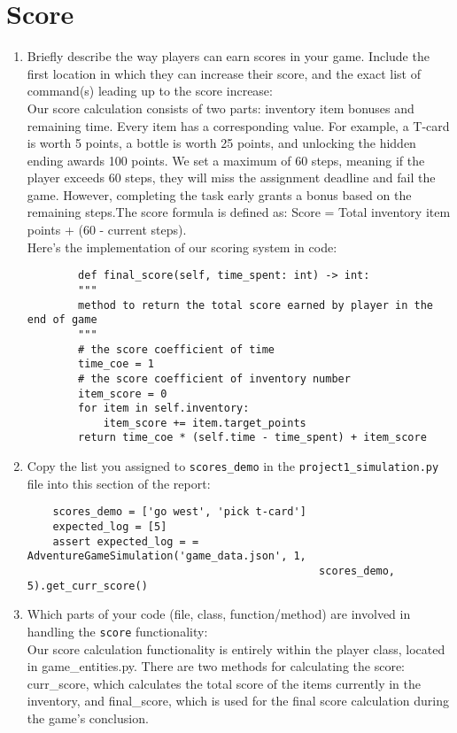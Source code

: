 \documentclass[11pt]{article}
\begin{document}
\section*{Score}
\begin{enumerate}

    \item Briefly describe the way players can earn scores in your game. Include the first location in which they can increase their score, and the exact list of command(s) leading up to the score increase:\\
    Our score calculation consists of two parts: inventory item bonuses and remaining time. Every item has a corresponding value. For example, a T-card is worth 5 points, a bottle is worth 25 points, and unlocking the hidden ending awards 100 points. We set a maximum of 60 steps, meaning if the player exceeds 60 steps, they will miss the assignment deadline and fail the game. However, completing the task early grants a bonus based on the remaining steps.The score formula is defined as: Score = Total inventory item points + (60 - current steps).\\
    Here’s the implementation of our scoring system in code:\\
    \begin{lstlisting}
        def final_score(self, time_spent: int) -> int:
        """
        method to return the total score earned by player in the end of game
        """
        # the score coefficient of time
        time_coe = 1
        # the score coefficient of inventory number
        item_score = 0
        for item in self.inventory:
            item_score += item.target_points
        return time_coe * (self.time - time_spent) + item_score
    \end{lstlisting}


    \item Copy the list you assigned to \texttt{scores\_demo} in the \texttt{project1\_simulation.py} file into this section of the report:
    \begin{lstlisting}
    scores_demo = ['go west', 'pick t-card']
    expected_log = [5]
    assert expected_log = = AdventureGameSimulation('game_data.json', 1, 
                                              scores_demo, 5).get_curr_score()
\end{lstlisting}

    \item Which parts of your code (file, class, function/method) are involved in handling the \texttt{score} functionality:\\
    Our score calculation functionality is entirely within the player class, located in game\_entities.py. There are two methods for calculating the score: curr\_score, which calculates the total score of the items currently in the inventory, and final\_score, which is used for the final score calculation during the game's conclusion.
\end{enumerate}
\end{document}
